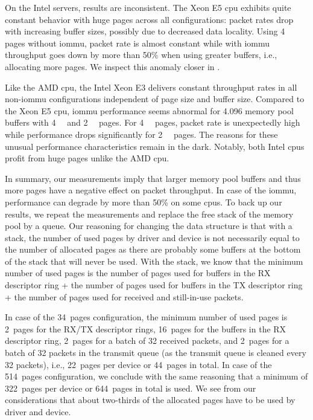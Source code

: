 On the Intel servers, results are inconsistent. The Xeon E5 \ac{cpu} exhibits
quite constant behavior with huge pages across all configurations: packet rates
drop with increasing buffer sizes, possibly due to decreased data locality.
Using \SI{4}{\kibi\byte} pages without \ac{iommu}, packet rate is almost
constant while with \ac{iommu} throughput goes down by more than 50\% when using
greater buffers, i.e., allocating more pages. We inspect this anomaly closer in
.

Like the AMD \ac{cpu}, the Intel Xeon E3 delivers constant throughput rates in
all non-\ac{iommu} configurations independent of page size and buffer size.
Compared to the Xeon E5 \ac{cpu}, \ac{iommu} performance seems abnormal for
\SI{4,096}{\byte} memory pool buffers with \SI{4}{\kibi\byte} and
\SI{2}{\mebi\byte} pages. For \SI{4}{\kibi\byte} pages, packet rate is
unexpectedly high while performance drops significantly for \SI{2}{\mebi\byte}
pages. The reasons for these unusual performance characteristics remain in the
dark. Notably, both Intel \acp{cpu} profit from huge pages unlike the AMD
\ac{cpu}.

In summary, our measurements imply that larger memory pool buffers and thus more
pages have a negative effect on packet throughput. In case of the \ac{iommu},
performance can degrade by more than 50\% on some \acp{cpu}. To back up our
results, we repeat the measurements and replace the free stack of the memory
pool by a queue. Our reasoning for changing the data structure is that with a
stack, the number of used pages by driver and device is not necessarily equal to
the number of allocated pages as there are probably some buffers at the bottom
of the stack that will never be used. With the stack, we know that the minimum
number of used pages is the number of pages used for buffers in the RX
descriptor ring + the number of pages used for buffers in the TX descriptor ring
+ the number of pages used for received and still-in-use packets.

In case of the 34~pages configuration, the minimum number of used pages is
2~pages for the RX/TX descriptor rings, 16~pages for the buffers in the RX
descriptor ring, 2~pages for a batch of 32 received packets, and 2~pages for a
batch of 32 packets in the transmit queue (as the transmit queue is cleaned
every 32 packets), i.e., 22~pages per device or 44~pages in total. In case of
the 514~pages configuration, we conclude with the same reasoning that a minimum
of 322~pages per device or 644~pages in total is used. We see from our
considerations that about two-thirds of the allocated pages have to be used by
driver and device.

